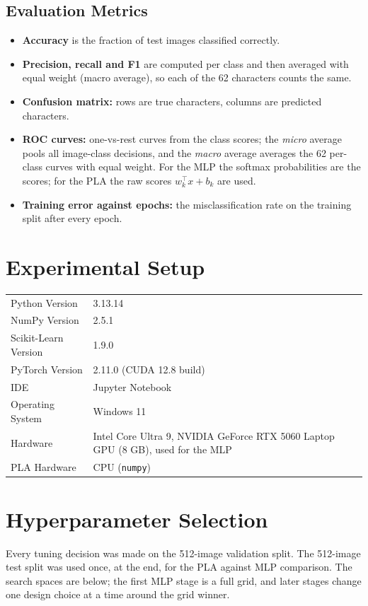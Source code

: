 \documentclass[12pt,a4paper]{article}
\begin{document}
\subsection*{Evaluation Metrics}
\begin{itemize}
\item \textbf{Accuracy} is the fraction of test images classified correctly.
\item \textbf{Precision, recall and F1} are computed per class and then averaged with equal
weight (macro average), so each of the 62 characters counts the same.
\item \textbf{Confusion matrix:} rows are true characters, columns are predicted characters.
\item \textbf{ROC curves:} one-vs-rest curves from the class scores; the \emph{micro} average
pools all image-class decisions, and the \emph{macro} average averages the 62 per-class curves
with equal weight. For the MLP the softmax probabilities are the scores; for the PLA the raw
scores $w_k^{\top}x + b_k$ are used.
\item \textbf{Training error against epochs:} the misclassification rate on the training split
after every epoch.
\end{itemize}

\section{Experimental Setup}
\begin{tabular}{lp{10.5cm}}
\toprule
Python Version & 3.13.14 \\
NumPy Version & 2.5.1 \\
Scikit-Learn Version & 1.9.0 \\
PyTorch Version & 2.11.0 (CUDA 12.8 build) \\
IDE & Jupyter Notebook \\
Operating System & Windows 11 \\
Hardware & Intel Core Ultra 9, NVIDIA GeForce RTX 5060 Laptop GPU (8 GB), used for the MLP \\
PLA Hardware & CPU (\texttt{numpy}) \\
\bottomrule
\end{tabular}

\section{Hyperparameter Selection}
Every tuning decision was made on the 512-image validation split. The 512-image test split was
used once, at the end, for the PLA against MLP comparison. The search spaces are below; the
first MLP stage is a full grid, and later stages change one design choice at a time around the
grid winner.
\end{document}
